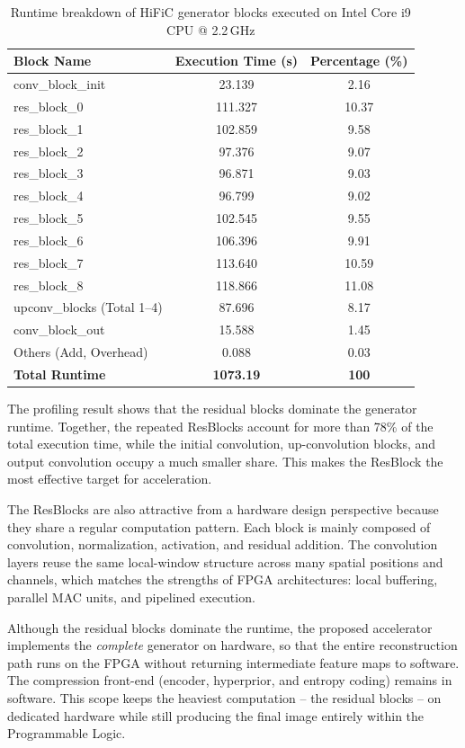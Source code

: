\begin{table}[H]
\centering
\caption{Runtime breakdown of HiFiC generator blocks executed on Intel Core i9 CPU @ 2.2\,GHz}
\label{tab:runtime_breakdown}
\begin{tabular}{|l|c|c|}
\hline
\textbf{Block Name} & \textbf{Execution Time (s)} & \textbf{Percentage (\%)} \\ \hline
conv\_block\_init & 23.139 & 2.16 \\ \hline
res\_block\_0 & 111.327 & 10.37 \\ \hline
res\_block\_1 & 102.859 & 9.58 \\ \hline
res\_block\_2 & 97.376 & 9.07 \\ \hline
res\_block\_3 & 96.871 & 9.03 \\ \hline
res\_block\_4 & 96.799 & 9.02 \\ \hline
res\_block\_5 & 102.545 & 9.55 \\ \hline
res\_block\_6 & 106.396 & 9.91 \\ \hline
res\_block\_7 & 113.640 & 10.59 \\ \hline
res\_block\_8 & 118.866 & 11.08 \\ \hline
upconv\_blocks (Total 1--4) & 87.696 & 8.17 \\ \hline
conv\_block\_out & 15.588 & 1.45 \\ \hline
Others (Add, Overhead) & 0.088 & 0.03 \\ \hline
\textbf{Total Runtime} & \textbf{1073.19} & \textbf{100} \\ \hline
\end{tabular}
\end{table}

The profiling result shows that the residual blocks dominate the generator runtime. Together, the repeated ResBlocks account for more than 78\% of the total execution time, while the initial convolution, up-convolution blocks, and output convolution occupy a much smaller share. This makes the ResBlock the most effective target for acceleration.

The ResBlocks are also attractive from a hardware design perspective because they share a regular computation pattern. Each block is mainly composed of convolution, normalization, activation, and residual addition. The convolution layers reuse the same local-window structure across many spatial positions and channels, which matches the strengths of FPGA architectures: local buffering, parallel MAC units, and pipelined execution.

Although the residual blocks dominate the runtime, the proposed accelerator implements the \emph{complete} generator on hardware, so that the entire reconstruction path runs on the FPGA without returning intermediate feature maps to software. The compression front-end (encoder, hyperprior, and entropy coding) remains in software. This scope keeps the heaviest computation -- the residual blocks -- on dedicated hardware while still producing the final image entirely within the Programmable Logic.

